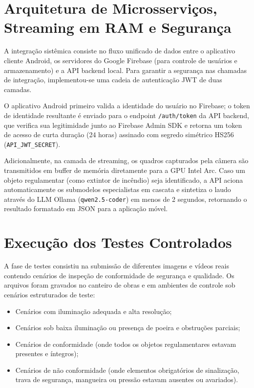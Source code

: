 \section{Arquitetura de Microsserviços, Streaming em RAM e Segurança}
A integração sistêmica consiste no fluxo unificado de dados entre o aplicativo cliente Android, os servidores do Google Firebase (para controle de usuários e armazenamento) e a API backend local. Para garantir a segurança nas chamadas de integração, implementou-se uma cadeia de autenticação JWT de duas camadas. 

O aplicativo Android primeiro valida a identidade do usuário no Firebase; o token de identidade resultante é enviado para o endpoint \texttt{/auth/token} da API backend, que verifica sua legitimidade junto ao Firebase Admin SDK e retorna um token de acesso de curta duração (24 horas) assinado com segredo simétrico HS256 (\texttt{API\_JWT\_SECRET}). 

Adicionalmente, na camada de streaming, os quadros capturados pela câmera são transmitidos em buffer de memória diretamente para a GPU Intel Arc. Caso um objeto regulamentar (como extintor de incêndio) seja identificado, a API aciona automaticamente os submodelos especialistas em cascata e sintetiza o laudo através do LLM Ollama (\texttt{qwen2.5-coder}) em menos de 2 segundos, retornando o resultado formatado em JSON para a aplicação móvel.

\section{Execução dos Testes Controlados}
A fase de testes consistiu na submissão de diferentes imagens e vídeos reais contendo cenários de inspeção de conformidade de segurança e qualidade. Os arquivos foram gravados no canteiro de obras e em ambientes de controle sob cenários estruturados de teste:
\begin{itemize}
    \item Cenários com iluminação adequada e alta resolução;
    \item Cenários sob baixa iluminação ou presença de poeira e obstruções parciais;
    \item Cenários de conformidade (onde todos os objetos regulamentares estavam presentes e íntegros);
    \item Cenários de não conformidade (onde elementos obrigatórios de sinalização, trava de segurança, mangueira ou pressão estavam ausentes ou avariados).
\end{itemize}

